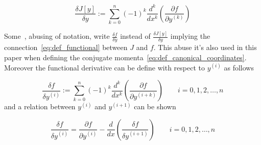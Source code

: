 \begin{equation} \label{eq:functional_derivative}
  \frac{\delta J[y]}{\delta y} := \sum_{k = 0}^{n} {(-1)}^k \frac{d^k}{dx^k}
  \left( \frac{\partial f}{\partial y^{(k)}}\right)
\end{equation}

Some~\cite{Chen13}, abusing of notation,  write $\frac{\delta f}{\delta y}$
instead of $\frac{\delta J[y]}{\delta y}$ implying the
connection~\eqref{eq:def_functional} between $J$ and $f$. This abuse it's
also used in this paper when defining the conjugate
momenta~\eqref{eq:def_canonical_coordinates}. Moreover the functional derivative
can be define with respect to $y^{(i)}$ as follows

\begin{equation} \label{eq:functional_derivative_y_i}
  \frac{\delta f}{\delta y^{(i)}} := \sum_{k = 0}^{n} {(-1)}^k \frac{d^k}{dx^k}
  \left( \frac{\partial f}{\partial y^{(i+k)}}\right)
  \qquad i = 0, 1, 2, \ldots, n
\end{equation}
and a relation between $y^{(i)}$ and $y^{(i+1)}$ can be shown

\begin{equation} \label{eq:functional_derivative_identity}
  \frac{\delta f}{\delta y^{(i)}} =
  \frac{\partial f}{\partial y^{(i)}} -
  \frac{d}{dx}\left(\frac{\delta f}{\delta y^{(i+1)}}\right)
  \qquad i = 0, 1, 2, \ldots, n
\end{equation}

